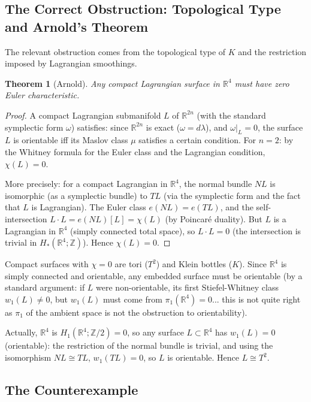 \documentclass[12pt]{article}
\newtheorem{theorem}{Theorem}
\theoremstyle{definition}
\begin{document}
\subsection{The Correct Obstruction: Topological Type and Arnold's Theorem}

The relevant obstruction comes from the topological type of $K$ and the restriction imposed by Lagrangian smoothings.

\begin{theorem}[Arnold]\label{thm:arnold}
Any compact Lagrangian surface in $\mathbb{R}^4$ must have zero Euler characteristic.
\end{theorem}

\begin{proof}
A compact Lagrangian submanifold $L$ of $\mathbb{R}^{2n}$ (with the standard symplectic form $\omega$) satisfies: since $\mathbb{R}^{2n}$ is exact ($\omega = d\lambda$), and $\omega|_L = 0$, the surface $L$ is orientable iff its Maslov class $\mu$ satisfies a certain condition. For $n = 2$: by the Whitney formula for the Euler class and the Lagrangian condition, $\chi(L) = 0$.

More precisely: for a compact Lagrangian in $\mathbb{R}^4$, the normal bundle $N L$ is isomorphic (as a symplectic bundle) to $TL$ (via the symplectic form and the fact that $L$ is Lagrangian). The Euler class $e(NL) = e(TL)$, and the self-intersection $L\cdot L = e(NL)[L] = \chi(L)$ (by Poincaré duality). But $L$ is a Lagrangian in $\mathbb{R}^4$ (simply connected total space), so $L\cdot L = 0$ (the intersection is trivial in $H_*(\mathbb{R}^4;\mathbb{Z})$). Hence $\chi(L) = 0$.
\end{proof}

Compact surfaces with $\chi = 0$ are tori ($T^2$) and Klein bottles ($K$). Since $\mathbb{R}^4$ is simply connected and orientable, any embedded surface must be orientable (by a standard argument: if $L$ were non-orientable, its first Stiefel-Whitney class $w_1(L)\neq 0$, but $w_1(L)$ must come from $\pi_1(\mathbb{R}^4) = 0$... this is not quite right as $\pi_1$ of the ambient space is not the obstruction to orientability).

Actually, $\mathbb{R}^4$ is $H_1(\mathbb{R}^4;\mathbb{Z}/2) = 0$, so any surface $L\subset\mathbb{R}^4$ has $w_1(L) = 0$ (orientable): the restriction of the normal bundle is trivial, and using the isomorphism $NL\cong TL$, $w_1(TL) = 0$, so $L$ is orientable. Hence $L\cong T^2$.

\subsection{The Counterexample}
\end{document}
